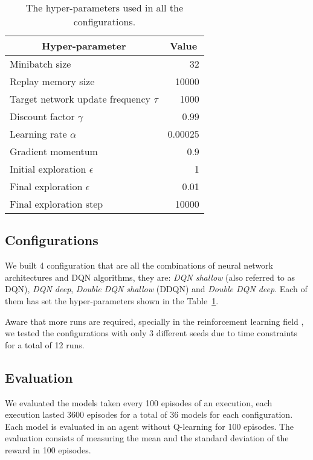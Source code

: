 \begin{table}
	\centering
	\begin{tabular}{|l|r|}
		\hline
		\multicolumn{1}{|c|}{\textbf{Hyper-parameter}} &
		\multicolumn{1}{|c|}{\textbf{Value}}        \\
		\hline
		Minibatch size & 32 \\
		Replay memory size & 10000 \\
		Target network update frequency $\tau$ & 1000 \\
		Discount factor $\gamma$ & 0.99 \\
		Learning rate $\alpha$ & 0.00025 \\
		Gradient momentum & 0.9 \\
		Initial exploration $\epsilon$ & 1 \\
		Final exploration $\epsilon$ & 0.01 \\
		Final exploration step & 10000 \\
		\hline
	\end{tabular}
	
	\caption{The hyper-parameters used in all the configurations.}
	\label{tab:my-hyperparams}
\end{table}

\subsection{Configurations}

We built 4 configuration that are all the combinations of neural network architectures and DQN algorithms, they are: \textit{DQN shallow} (also referred to as DQN), \textit{DQN deep}, \textit{Double DQN shallow} (DDQN) and \textit{Double DQN deep}. Each of them has set the hyper-parameters shown in the Table~\ref{tab:my-hyperparams}.

Aware that more runs are required, specially in the reinforcement learning field \cite{DBLP:journals/corr/abs-1709-06560}, we tested the configurations with only 3 different seeds due to time constraints for a total of 12 runs.


\subsection{Evaluation}

We evaluated the models taken every 100 episodes of an execution, each execution lasted 3600 episodes for a total of 36 models for each configuration. Each model is evaluated in an agent without Q-learning for 100 episodes. The evaluation consists of measuring the mean and the standard deviation of the reward in 100 episodes.



